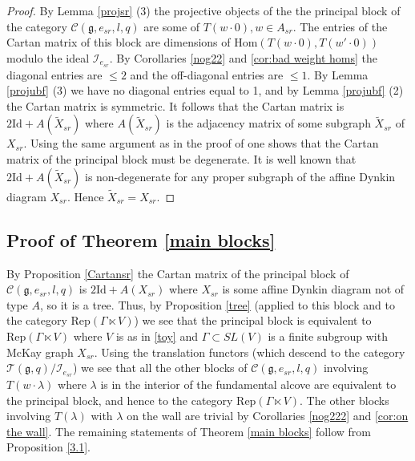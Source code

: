 \documentclass{amsart}
\theoremstyle{definition}
\newcommand{\C}{\mathcal{C}}
\newcommand{\g}{\mathfrak{g}}
\newcommand{\T}{\mathcal{T}}
\newcommand{\cI}{\mathcal{I}}
\newcommand{\Rep}{\text{Rep}}
\newcommand{\Id}{\text{Id}}
\newcommand{\Hom}{\mathrm{Hom}}
\numberwithin{equation}{section}
\begin{document}
\begin{proof}
By Lemma \ref{projsr} (3) the projective objects of the the principal block of the category $\C(\g,e_{sr},l,q)$ are some of $T(w\cdot 0), w\in A_{sr}$. The entries of the Cartan
matrix of this block are dimensions of $\Hom(T(w\cdot 0), T(w'\cdot 0))$ modulo the ideal $\cI_{e_{sr}}$. By Corollaries \ref{nog22} and \ref{cor:bad weight homs}  the diagonal entries are $\le 2$ and the off-diagonal entries are $\le 1$. By  Lemma \ref{projubf} (3) we have no diagonal entries equal to 1, and by 
Lemma \ref{projubf} (2) the Cartan matrix is symmetric. It follows that the Cartan matrix
is $2\Id+A(\tilde X_{sr})$ where $A(\tilde X_{sr})$ is the adjacency matrix of some subgraph
$\tilde X_{sr}$ of $X_{sr}$. Using the same argument as in the proof of \cite[Theorem 6.6.1]{EGNO}
one shows that the Cartan matrix of the principal block must be degenerate. It is well known
that $2\Id+A(\tilde X_{sr})$ is non-degenerate for any proper subgraph of the affine Dynkin
diagram $X_{sr}$. Hence $\tilde X_{sr}=X_{sr}$. 
\end{proof}

\subsection{Proof of Theorem \ref{main blocks}} By Proposition \ref{Cartansr} the Cartan
matrix of the principal block of $\C(\g,e_{sr},l,q)$ is $2\Id+A(X_{sr})$ where $X_{sr}$ is
some affine Dynkin diagram not of type $A$, so it is a tree. Thus, by Proposition \ref{tree}
(applied to this block and to the category $\Rep(\Gamma \ltimes V)$)
we see that the principal block is equivalent to $\Rep(\Gamma \ltimes V)$ where 
$V$ is as in \ref{toy} and $\Gamma \subset SL(V)$ is a finite subgroup with McKay graph $X_{sr}$.
Using the translation functors (which descend to the category $\T(\g,q)/\cI_{e_{sr}}$) we see
that all the other blocks of $\C(\g,e_{sr},l,q)$ involving $T(w\cdot \lambda)$ where $\lambda$
is in the interior of the fundamental alcove are equivalent to the principal block, and hence
to the category $\Rep(\Gamma \ltimes V)$. The other blocks involving $T(\lambda)$ with $\lambda$
on the wall are trivial by Corollaries \ref{nog222} and \ref{cor:on the  wall}. The remaining statements of 
Theorem \ref{main blocks} follow from Proposition \ref{3.1}.
\end{document}
